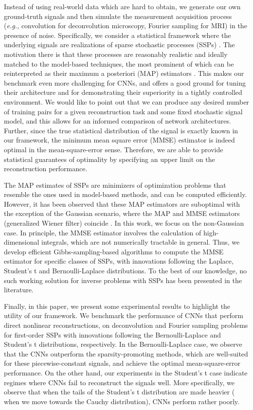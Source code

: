 \documentclass[journal]{IEEEtran}
\begin{document}
Instead of using real-world data which are hard to obtain, we generate our own ground-truth signals and then simulate the measurement acquisition process (\textit{e.g.,} convolution for deconvolution microscopy, Fourier sampling for MRI) in the presence of noise. Specifically, we consider a statistical framework where the underlying signals are realizations of sparse stochastic processes (SSPs) \cite{unser2014ssp}. The motivation there is that these processes are reasonably realistic and ideally matched to the model-based techniques, the most prominent of which can be reinterpreted as their maximum a posteriori (MAP) estimators \cite{kamilov2012mmse}. This makes our benchmark even more challenging for CNNs, and offers a good ground for tuning their architecture and for demonstrating their superiority in a tightly controlled environment. We would like to point out that we can produce any desired number of training pairs for a given reconstruction task and some fixed stochastic signal model, and this allows for an informed comparison of network architectures. Further, since the true statistical distribution of the signal is exactly known in our framework, the minimum mean square error (MMSE) estimator is indeed optimal in the mean-square-error sense. Therefore, we are able to provide statistical guarantees of optimality by specifying an upper limit on the reconstruction performance.

The MAP estimates of SSPs are minimizers of optimization problems that resemble the ones used in model-based methods, and can be computed efficiently. However, it has been observed that these MAP estimators are suboptimal \cite{kamilov2012mmse,amini2012bayesian} with the exception of the Gaussian scenario, where the MAP and MMSE estimators (generalized Wiener filter) coincide \cite{kay1993fundamentals}. In this work, we focus on the non-Gaussian case. In principle, the MMSE estimator involves the calculation of high-dimensional integrals, which are not numerically tractable in general. Thus, we develop efficient Gibbs-sampling-based algorithms to compute the MMSE estimator for specific classes of SSPs, with innovations following the Laplace, Student's t and Bernoulli-Laplace distributions. To the best of our knowledge, no such working solution for inverse problems with SSPs has been presented in the literature.

Finally, in this paper, we present some experimental results to highlight the utility of our framework. We benchmark the performance of CNNs that perform direct nonlinear reconstructions, on deconvolution and Fourier sampling problems for first-order SSPs with innovations following the Bernoulli-Laplace and Student's t distributions, respectively. In the Bernoulli-Laplace case, we observe that the CNNs outperform the sparsity-promoting methods, which are well-suited for these piecewise-constant signals, and achieve the optimal mean-square-error performance. On the other hand, our experiments in the Student's t case indicate regimes where CNNs fail to reconstruct the signals well. More specifically, we observe that when the tails of the Student's t distribution are made heavier ( when we move towards the Cauchy distribution), CNNs perform rather poorly.       
\end{document}
